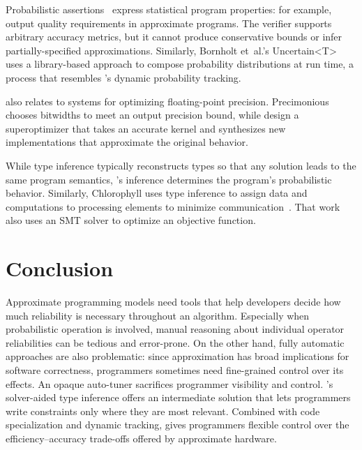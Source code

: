 Probabilistic assertions~\cite{passert} express statistical program
properties: for example, output quality requirements in approximate programs.
The verifier supports arbitrary accuracy metrics, but it cannot produce
conservative bounds or infer partially-specified approximations.
Similarly, Bornholt et~al.'s \mbox{Uncertain\textless{T}\textgreater}~\cite{uncertaint} uses a library-based approach to
compose probability distributions at run time, a process that resembles \lang's
dynamic probability tracking.

\lang also relates to systems for optimizing floating-point precision.
Precimonious~\cite{precimonious} chooses bitwidths to meet an output precision
bound, while \citet{stoke-fp} design a superoptimizer that
takes an accurate kernel and
synthesizes new implementations that approximate the original
behavior.

While type inference typically reconstructs types so that any solution leads
to the same program semantics, \lang's inference determines the
program's probabilistic behavior.
Similarly,
Chlorophyll uses type inference to assign data and computations to processing
elements to minimize communication~\cite{chlorophyll}.
That work also uses an SMT solver to optimize an objective function.


\section{Conclusion}

Approximate programming models need tools that help developers decide how much
reliability is necessary throughout an algorithm.
Especially when probabilistic operation is involved, manual reasoning about
individual operator reliabilities can be tedious and error-prone.
On the other hand, fully automatic approaches are also problematic: since
approximation has broad implications for software correctness, programmers
sometimes need fine-grained control over its effects.
An opaque auto-tuner sacrifices programmer visibility and control.
\lang's solver-aided type inference offers an intermediate solution that lets programmers
write constraints only where they are most relevant.
Combined with code specialization and dynamic tracking, \lang gives
programmers flexible control over the efficiency--accuracy trade-offs offered
by approximate hardware.
